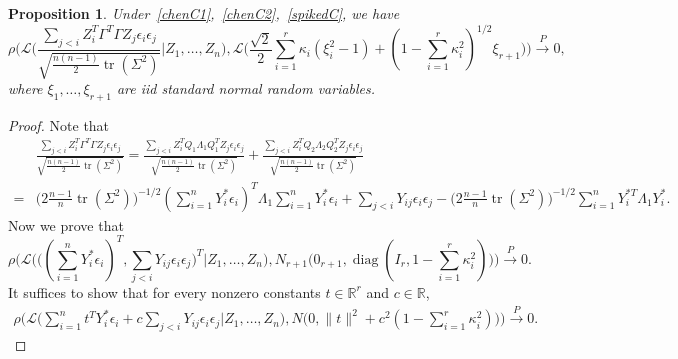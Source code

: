 \documentclass[3p]{elsarticle}
\DeclareMathOperator{\mytr}{tr}
\DeclareMathOperator{\mydiag}{diag}
\theoremstyle{plain}
\newtheorem{proposition}{\quad\quad Proposition}
\theoremstyle{definition}
\theoremstyle{remark}
\begin{document}
\begin{proposition}\label{nomuProp}
    Under~\eqref{chenC1},~\eqref{chenC2},~\eqref{spikedC},
    we have
    $$
        \rho\Big(
        \mathcal{L}\Big(
    \frac{\sum_{j<i} Z_i^T \Gamma^T \Gamma Z_j \epsilon_i \epsilon_j}
    {\sqrt{\frac{n(n-1)}{2}\mytr(\Sigma^2)}}
        \Big|Z_1,\ldots,Z_n\Big)
        ,
        \mathcal{L}\big(\frac{\sqrt{2}}{2}\sum_{i=1}^r \kappa_i (\xi_i^2-1) + (1-\sum_{i=1}^r \kappa_i^2)^{1/2}\xi_{r+1}\big)
        \Big)
        \xrightarrow{P}0,
    $$
    where $\xi_1,\ldots,\xi_{r+1}$ are iid standard normal random variables.
\end{proposition}
\begin{proof}
    Note that
    $$
    \begin{aligned}
        &
    \frac{\sum_{j<i} Z_i^T \Gamma^T \Gamma Z_j \epsilon_i \epsilon_j}
    {\sqrt{\frac{n(n-1)}{2}\mytr(\Sigma^2)}}
        =
        \frac{\sum_{j<i}Z_i^T Q_1 \Lambda_1 Q_1^T Z_j \epsilon_i \epsilon_j}
    {\sqrt{\frac{n(n-1)}{2}\mytr(\Sigma^2)}}
        +
        \frac{\sum_{j<i}Z_i^T Q_2 \Lambda_2 Q_2^T Z_j \epsilon_i \epsilon_j}
    {\sqrt{\frac{n(n-1)}{2}\mytr(\Sigma^2)}}
    \\
        =&
        \big(2\frac{n-1}{n}\mytr(\Sigma^2)\big)^{-1/2}(\sum_{i=1}^n  Y_i^* \epsilon_i)^T \Lambda_1 \sum_{i=1}^n  Y_i^* \epsilon_i
        +
        \sum_{j<i} Y_{ij} \epsilon_i \epsilon_j
        -
        \big(2\frac{n-1}{n}\mytr(\Sigma^2)\big)^{-1/2}
        \sum_{i=1}^n Y_i^{*T}\Lambda_1 Y_i^*
        .
    \end{aligned}
    $$
    Now we prove that
    \begin{equation}\label{xz:toProve}
    \rho\Big(\mathcal{L}\big(
    \big( (\sum_{i=1}^n Y_i^* \epsilon_i)^T ,
    \sum_{j<i} Y_{ij} \epsilon_i \epsilon_j \big)^T
    \big|Z_1,\ldots,Z_n\big), N_{r+1}\big(0_{r+1},\mydiag(I_r,1-\sum_{i=1}^r \kappa_i^2)\big)\Big)
        \xrightarrow{P}0.
    \end{equation}
    It suffices to show that for every nonzero constants $t\in\mathbb{R}^r$ and $c\in\mathbb{R}$,
    \begin{equation*}
        \begin{aligned}
            \rho\Big(\mathcal{L}\big( \sum_{i=1}^n t^T Y_i^* \epsilon_i+c\sum_{j<i} Y_{ij} \epsilon_i \epsilon_j \big| Z_1,\ldots,Z_n\big)
            ,
            N\big(0,\|t\|^2+c^2(1-\sum_{i=1}^r \kappa_i^2)\big)\Big)\xrightarrow{P} 0.
        \end{aligned}
    \end{equation*}

\end{proof}
\end{document}
